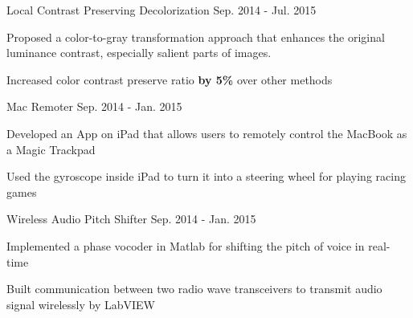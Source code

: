 


\begin{cventries}


\cventrytwo
{Local Contrast Preserving Decolorization {}} %
{Sep. 2014 -  Jul. 2015} %
{ %
\begin{cvitems}
\item {Proposed a color-to-gray transformation approach that enhances the original
luminance contrast, especially salient parts of images.}
\item {Increased color contrast preserve ratio \textbf{by 5\%} over other methods}
\end{cvitems}
}

\cventrytwo
{Mac Remoter {}} %
{Sep. 2014 -  Jan. 2015} %
{ %
\begin{cvitems}
\item {Developed an App on iPad that allows users to remotely control the MacBook as a
Magic Trackpad}
\item {Used the gyroscope inside iPad to turn it into a steering wheel for playing racing games}
\end{cvitems}
}

\cventrytwo
{Wireless Audio Pitch Shifter {}} %
{Sep. 2014 -  Jan. 2015} %
{ %
\begin{cvitems}
\item {Implemented a phase vocoder in Matlab for shifting the pitch of voice in real-time }
\item {Built communication between two radio wave transceivers to transmit audio signal wirelessly by LabVIEW}
\end{cvitems}
}

\end{cventries}